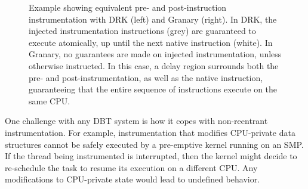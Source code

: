 \documentclass[preprint]{sigplanconf}
\begin{document}
\begin{figure}[t!]
\begin{multicols}{2}
\vspace{-1.5em}\vspace{-2.5em}
\columnbreak
\vspace{-1.5em}\hspace{-0.5em}\vspace{-2.5em}
\end{multicols}
\caption{Example showing equivalent pre- and post-instruction instrumentation with DRK (left) and Granary (right). In DRK, the injected instrumentation instructions (grey) are guaranteed to execute atomically, up until the next native instruction (white). In Granary, no guarantees are made on injected instrumentation, unless otherwise instructed. In this case, a delay region surrounds both the pre- and post-instrumentation, as well as the native instruction, guaranteeing that the entire sequence of instructions execute on the same CPU.}
\end{figure}

One challenge with any DBT system is how it copes with non-reentrant instrumentation. For example, instrumentation that modifies CPU-private data structures cannot be safely executed by a pre-emptive kernel running on an SMP. If the thread being instrumented is interrupted, then the kernel might decide to re-schedule the task to resume its execution on a different CPU. Any modifications to CPU-private state would lead to undefined behavior.
\end{document}
